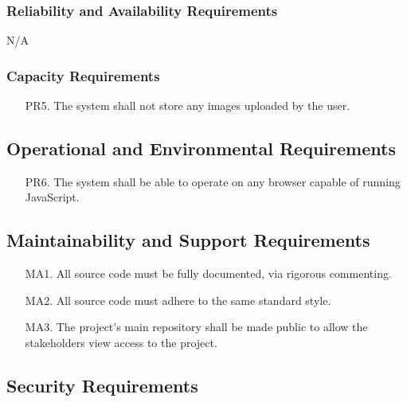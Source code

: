 \documentclass[11pt]{article}
\begin{document}
\subsubsection{Reliability and Availability Requirements} %

N/A

\subsubsection{Capacity Requirements} %

\begin{enumerate}
    \item [PR5.] The system shall not store any images uploaded by the user.
\end{enumerate}

\subsection{Operational and Environmental Requirements}

\begin{enumerate}
    \item [PR6.] The system shall be able to operate on any browser capable of running JavaScript.
\end{enumerate}

\subsection{Maintainability and Support Requirements} %

\begin{enumerate}
    \item [MA1.] All source code must be fully documented, via rigorous commenting.
    
    \item [MA2.] All source code must adhere to the same standard style.
    
    \item [MA3.] The project's main repository shall be made public to allow the stakeholders view access to the project.
\end{enumerate}

\subsection{Security Requirements}
\end{document}
